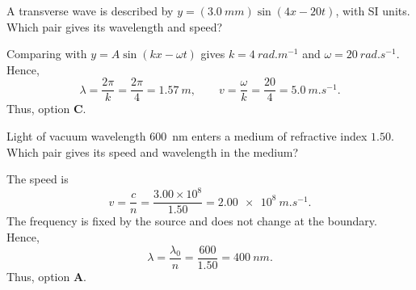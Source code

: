 \begin{quizquestion}[
  id=phy104-wave-011,
  topic=waves-and-sound,
  difficulty=foundation,
  marks=1,
  correct=C,
  tags={travelling-wave,wavelength,wave-speed},
  outcome={Extract wavelength and speed from a travelling-wave equation}
]
  A transverse wave is described by \(y=(\SI{3.0}{mm})\sin(4x-20t)\), with SI units. Which pair gives its wavelength and speed?
\end{quizquestion}
\begin{quizsolution}
  Comparing with \(y=A\sin(kx-\omega t)\) gives \(k=\SI{4}{rad.m^{-1}}\) and \(\omega=\SI{20}{rad.s^{-1}}\). Hence,
  \[
    \lambda=\frac{2\pi}{k}=\frac{2\pi}{4}=\SI{1.57}{m},
    \qquad
    v=\frac{\omega}{k}=\frac{20}{4}=\SI{5.0}{m.s^{-1}}.
  \]
  Thus, option \textbf{C}.
\end{quizsolution}

\begin{quizquestion}[
  id=phy104-opt-016,
  topic=optics,
  difficulty=foundation,
  marks=1,
  correct=A,
  tags={refraction,refractive-index,wavelength},
  outcome={Determine wave speed and wavelength in a refracting medium}
]
  Light of vacuum wavelength \SI{600}{nm} enters a medium of refractive index \(1.50\). Which pair gives its speed and wavelength in the medium?
\end{quizquestion}
\begin{quizsolution}
  The speed is
  \[
    v=\frac{c}{n}=\frac{3.00\times10^8}{1.50}=\SI{2.00e8}{m.s^{-1}}.
  \]
  The frequency is fixed by the source and does not change at the boundary. Hence,
  \[
    \lambda=\frac{\lambda_0}{n}=\frac{600}{1.50}=\SI{400}{nm}.
  \]
  Thus, option \textbf{A}.
\end{quizsolution}

